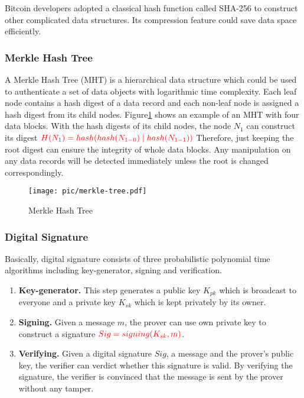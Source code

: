 \documentclass[conference]{IEEEtran}
\begin{document}
Bitcoin developers adopted a classical hash function called SHA-256 to construct other complicated data structures. Its compression feature could save data space efficiently.

\subsubsection{Merkle Hash Tree\cite{merkle1989certified}}
A Merkle Hash Tree (MHT) is a hierarchical data structure which could be used to authenticate a set of data objects with logarithmic time complexity.
%
Each leaf node contains a hash digest of a data record and each non-leaf node is assigned a hash digest from its child nodes.
%
Figure\ref{Merkle} shows an example of an MHT with four data blocks.
%
With the hash digests of its child nodes, the node $N_1$ can construct its digest  $\color{red} H(N_1) = hash(hash(N_{1-0}) \mid hash(N_{1-1}))$
%
Therefore, just keeping the root digest can ensure the integrity of whole data blocks.
%
Any manipulation on any data records will be detected immediately unless the root is changed correspondingly.

\begin{figure}[ht]
    \centering
    \texttt{[image: pic/merkle-tree.pdf]}
    \caption{Merkle Hash Tree}
    \label{Merkle}
\end{figure}

\subsubsection{Digital Signature}
Basically, digital signature consists of three probabilistic polynomial time algorithms including key-generator, signing and verification.

\begin{enumerate}
    \item \textbf{Key-generator.} This step generates a public key $K_{pk}$ which is broadcast to everyone and a private key $K_{sk}$ which is kept privately by its owner.
    \item \textbf{Signing.} Given a message $m$, the prover can use own private key to construct a signature $\color{red} Sig = signing(K_{sk},m)$.
    \item \textbf{Verifying.} Given a digital signature $Sig$, a message and the prover's public key, the verifier can verdict whether this signature is valid.
          By verifying the signature, the verifier is convinced that the message is sent by the prover without any tamper. 
\end{enumerate}
\end{document}
